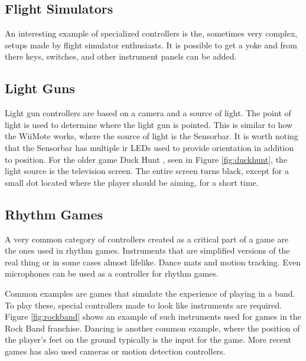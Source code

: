 \subsection{Flight Simulators}
An interesting example of specialized controllers is the, sometimes very complex, setups made by flight simulator enthusiasts.
It is possible to get a yoke and from there keys, switches, and other instrument panels can be added.

\subsection{Light Guns}
\label{lightguns}
Light gun controllers are based on a camera and a source of light.
The point of light is used to determine where the light gun is pointed.
This is similar to how the WiiMote works, where the source of light is the Sensorbar.
It is worth noting that the Sensorbar has multiple \gls{ir} LEDs used to provide orientation in addition to position.
For the older game Duck Hunt \cite{duckhunt1984}, seen in Figure \ref{fig:duckhunt}, the light source is the television screen.
The entire screen turns black, except for a small dot located where the player should be aiming, for a short time.

\subsection{Rhythm Games}
A very common category of controllers created as a critical part of a game are the ones used in rhythm games.
Instruments that are simplified versions of the real thing or in some cases almost lifelike.
Dance mats and motion tracking.
Even microphones can be used as a controller for rhythm games.

Common examples are games that simulate the experience of playing in a band.
To play these, special controllers made to look like instruments are required.
Figure \ref{fig:rockband} shows an example of such instruments used for games in the Rock Band franchise.
Dancing is another common example, where the position of the player's feet on the ground typically is the input for the game.
More recent games has also used cameras or motion detection controllers.

